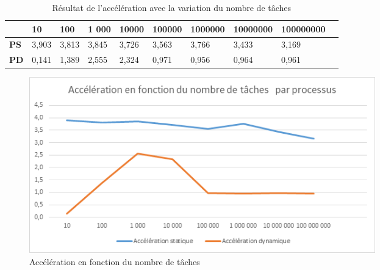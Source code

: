 \documentclass[a4paper,12pt]{article}
\begin{document}
\begin{table}[H]
\caption{Résultat de l'accélération avec la variation du nombre de tâches}
\label{tab:acc3}
\begin{tabular}{|l|l|l|l|l|l|l|l|l|l|}
\hline
            & \textbf{10} & \textbf{100} & \textbf{1 000} & \textbf{10000} & \textbf{100000} & \textbf{1000000} & \textbf{10000000} & \textbf{100000000} \\ \hline
\textbf{PS} & 3,903       & 3,813        & 3,845          & 3,726          & 3,563           & 3,766            & 3,433             & 3,169              \\ \hline
\textbf{PD} & 0,141       & 1,389        & 2,555          & 2,324          & 0,971           & 0,956 			& 0,964             & 0,961            	 \\ \hline

\end{tabular}
\end{table}

\begin{figure}[H]
\center \includegraphics[width=15cm]{acc3} %
\caption{Accélération en fonction du nombre de tâches}
\label{fig:acc3}
\end{figure}
\end{document}
